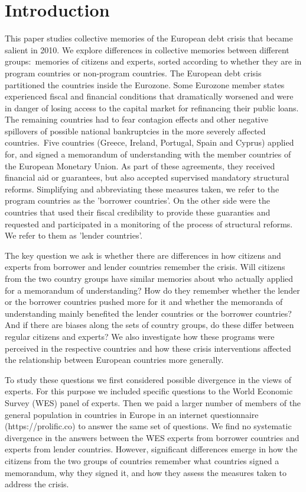 \section{Introduction}

This paper studies collective memories of the European debt crisis that
became salient in 2010. We explore differences in collective
memories between different groups:\ memories of citizens and experts, sorted
according to whether they are in program countries or non-program countries.
The European debt crisis partitioned the countries inside the Eurozone. Some
Eurozone member states experienced fiscal and financial conditions that
dramatically worsened and were in danger of losing access to the capital
market for refinancing their public loans. The remaining countries had to
fear contagion effects and other negative spillovers of possible national
bankruptcies in the more severely affected countries.\ Five countries
(Greece, Ireland, Portugal, Spain and Cyprus) applied for, and signed a
memorandum of understanding with the member countries of the European
Monetary Union. As part of these agreements, they received financial aid or
guarantees, but also accepted supervised mandatory structural reforms.
Simplifying and abbreviating these measures taken, we refer to the program
countries as the 'borrower countries'. On the other side were the countries
that used their fiscal credibility to provide these guaranties and requested
and participated in a monitoring of the process of structural reforms. We
refer to them as 'lender countries'.

The key question we ask is whether there are differences in how
citizens and experts from borrower and lender countries remember the crisis.
Will citizens from the two country groups have similar memories about who
actually applied for a memorandum of understanding? How do they remember
whether the lender or the borrower countries pushed more for it and whether
the memoranda of understanding mainly benefited the lender countries or the
borrower countries? And if there are biases along the sets of country
groups, do these differ between regular citizens and experts? We also
investigate how these programs were perceived in the respective countries
and how these crisis interventions affected the relationship between European
countries more generally.\ 

To study these questions we first considered possible divergence in the
views of experts. For this purpose we included specific questions to the
World Economic Survey (WES) panel of experts. Then we paid a larger number
of members of the general population in countries in Europe in an internet
questionnaire (https://prolific.co) to answer the same set of questions. We
find no systematic divergence in the answers between the WES experts from
borrower countries and experts from lender countries. However, significant
differences emerge in how the citizens from the two groups of countries
remember what countries signed a memorandum, why they signed it, and how
they assess the measures taken to address the crisis.


